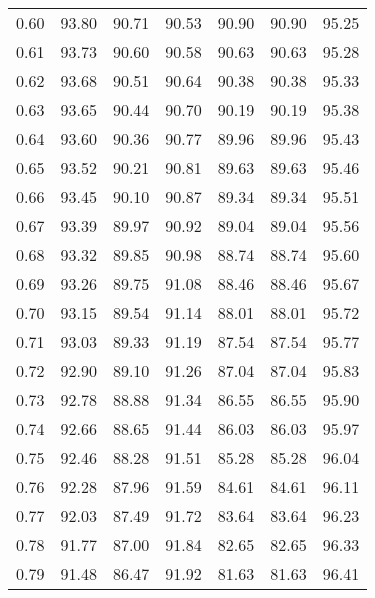 \begin{tabular}{|c|c|c|c|c|c|c|}
      0.60 &     93.80 &     90.71 &      90.53 &   90.90 &      90.90 &         95.25 \\
      0.61 &     93.73 &     90.60 &      90.58 &   90.63 &      90.63 &         95.28 \\
      0.62 &     93.68 &     90.51 &      90.64 &   90.38 &      90.38 &         95.33 \\
      0.63 &     93.65 &     90.44 &      90.70 &   90.19 &      90.19 &         95.38 \\
      0.64 &     93.60 &     90.36 &      90.77 &   89.96 &      89.96 &         95.43 \\
      0.65 &     93.52 &     90.21 &      90.81 &   89.63 &      89.63 &         95.46 \\
      0.66 &     93.45 &     90.10 &      90.87 &   89.34 &      89.34 &         95.51 \\
      0.67 &     93.39 &     89.97 &      90.92 &   89.04 &      89.04 &         95.56 \\
      0.68 &     93.32 &     89.85 &      90.98 &   88.74 &      88.74 &         95.60 \\
      0.69 &     93.26 &     89.75 &      91.08 &   88.46 &      88.46 &         95.67 \\
      0.70 &     93.15 &     89.54 &      91.14 &   88.01 &      88.01 &         95.72 \\
      0.71 &     93.03 &     89.33 &      91.19 &   87.54 &      87.54 &         95.77 \\
      0.72 &     92.90 &     89.10 &      91.26 &   87.04 &      87.04 &         95.83 \\
      0.73 &     92.78 &     88.88 &      91.34 &   86.55 &      86.55 &         95.90 \\
      0.74 &     92.66 &     88.65 &      91.44 &   86.03 &      86.03 &         95.97 \\
      0.75 &     92.46 &     88.28 &      91.51 &   85.28 &      85.28 &         96.04 \\
      0.76 &     92.28 &     87.96 &      91.59 &   84.61 &      84.61 &         96.11 \\
      0.77 &     92.03 &     87.49 &      91.72 &   83.64 &      83.64 &         96.23 \\
      0.78 &     91.77 &     87.00 &      91.84 &   82.65 &      82.65 &         96.33 \\
      0.79 &     91.48 &     86.47 &      91.92 &   81.63 &      81.63 &         96.41 \\

\end{tabular}
